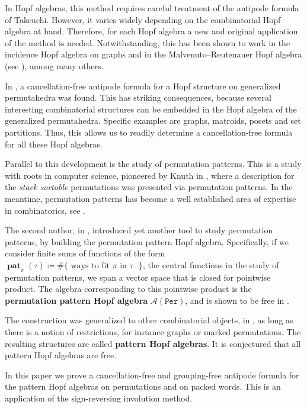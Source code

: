 \documentclass[12pt, reqno]{amsart}
\theoremstyle{definition}
\DeclareMathOperator{\pat}{\mathbf{pat}}
\begin{document}
In Hopf algebras, this method requires careful treatment of the antipode formula of Takeuchi.
However, it varies widely depending on the combinatorial Hopf algebra at hand.
Therefore, for each Hopf algebra a new and original application of the method is needed.
Notwithstanding, this has been shown to work in the incidence Hopf algebra on graphs and in the Malvenuto–Reutenauer Hopf algebra (see \cite{MalvenutoReutenauer}), among many others.

In \cite{aguiar2017hopf}, a cancellation-free antipode formula for a Hopf structure on generalized permutahedra was found. 
This has striking consequences, because several interesting combinatorial structures can be embedded in the Hopf algebra of the generalized permutahedra.
Specific examples are graphs, matroids, posets and set partitions.
Thus, this allows us to readily determine a cancellation-free formula for all these Hopf algebras.

Parallel to this development is the study of permutation patterns.
This is a study with roots in computer science, pioneered by Knuth in \cite{Knuth}, where a description for the \textit{stack sortable} permutations was presented via permutation patterns.
In the meantime, permutation patterns has become a well established area of expertise in combinatorics, see \cite{linton2010permutation}.

The second author, in \cite{Vargas}, introduced yet another tool to study permutation patterns, by building the permutation pattern Hopf algebra.
Specifically, if we consider finite sums of functions of the form $\pat_{\pi}(\tau)\coloneqq  \#\{\text{ ways to fit $\pi$ in $\tau$ }\}$, the central functions in the study of permutation patterns, we span a vector space that is closed for pointwise product.
The algebra corresponding to this pointwise product is the \textbf{permutation pattern Hopf algebra} $\mathcal{A}(\mathtt{Per})$, and is shown to be free in \cite{Vargas}.

The construction was generalized to other combinatorial objects, in \cite{Penaguiao2020}, as long as there is a notion of restrictions, for instance graphs or marked permutations.
The resulting structures are called \textbf{pattern Hopf algebras}.
It is conjectured that all pattern Hopf algebras are free.

In this paper we prove a cancellation-free and grouping-free antipode formula for the pattern Hopf algebras on permutations and on packed words.
This is an application of the sign-reversing involution method.
\end{document}
